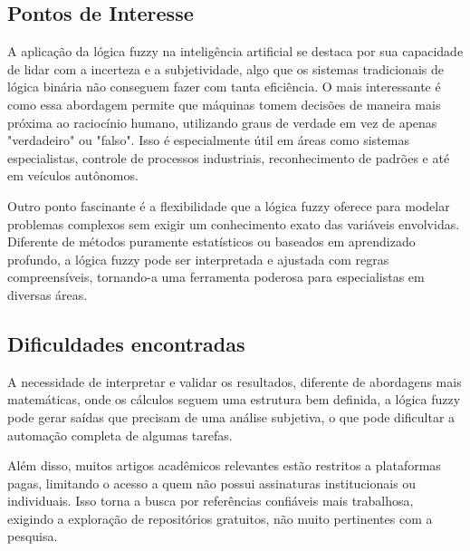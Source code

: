 \documentclass[12pt]{article}
\begin{document}
\subsection{Pontos de Interesse}
A aplicação da lógica fuzzy na inteligência artificial se destaca por sua capacidade de lidar com a incerteza e a subjetividade, algo que os sistemas tradicionais de lógica binária não conseguem fazer com tanta eficiência. O mais interessante é como essa abordagem permite que máquinas tomem decisões de maneira mais próxima ao raciocínio humano, utilizando graus de verdade em vez de apenas "verdadeiro" ou "falso". Isso é especialmente útil em áreas como sistemas especialistas, controle de processos industriais, reconhecimento de padrões e até em veículos autônomos.

Outro ponto fascinante é a flexibilidade que a lógica fuzzy oferece para modelar problemas complexos sem exigir um conhecimento exato das variáveis envolvidas. Diferente de métodos puramente estatísticos ou baseados em aprendizado profundo, a lógica fuzzy pode ser interpretada e ajustada com regras compreensíveis, tornando-a uma ferramenta poderosa para especialistas em diversas áreas.

\subsection{Dificuldades encontradas}

A necessidade de interpretar e validar os resultados, diferente de abordagens mais matemáticas, onde os cálculos seguem uma estrutura bem definida, a lógica fuzzy pode gerar saídas que precisam de uma análise subjetiva, o que pode dificultar a automação completa de algumas tarefas.

Além disso, muitos artigos acadêmicos relevantes estão restritos a plataformas pagas, limitando o acesso a quem não possui assinaturas institucionais ou individuais. Isso torna a busca por referências confiáveis mais trabalhosa, exigindo a exploração de repositórios gratuitos, não muito pertinentes com a pesquisa.




\end{document}
